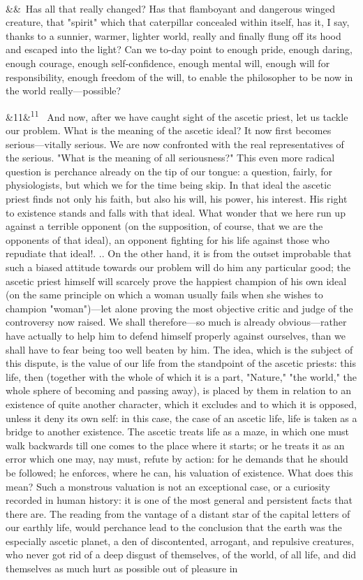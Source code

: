 \documentclass[12pt]{article}
\newcommand{\para}[1][]{\par\noindent\ifx&#1&\else\textsuperscript{\footnotesize #1}~\fi}
\begin{document}
\para Has all that really changed? Has that flamboyant and dangerous winged creature, that "spirit" which that caterpillar concealed within itself, has it, I say, thanks to a sunnier, warmer, lighter world, really and finally flung off its hood and escaped into the light? Can we to-day point to enough pride, enough daring, enough courage, enough self-confidence, enough mental will, enough will for responsibility, enough freedom of the will, to enable the philosopher to be now in the world really---possible?

\para[11] And now, after we have caught sight of the ascetic priest, let us tackle our problem. What is the meaning of the ascetic ideal? It now first becomes serious---vitally serious. We are now confronted with the real representatives of the serious. "What is the meaning of all seriousness?" This even more radical question is perchance already on the tip of our tongue: a question, fairly, for physiologists, but which we for the time being skip. In that ideal the ascetic priest finds not only his faith, but also his will, his power, his interest. His right to existence stands and falls with that ideal. What wonder that we here run up against a terrible opponent (on the supposition, of course, that we are the opponents of that ideal), an opponent fighting for his life against those who repudiate that ideal!. .. On the other hand, it is from the outset improbable that such a biased attitude towards our problem will do him any particular good; the ascetic priest himself will scarcely prove the happiest champion of his own ideal (on the same principle on which a woman usually fails when she wishes to champion "woman")---let alone proving the most objective critic and judge of the controversy now raised. We shall therefore---so much is already obvious---rather have actually to help him to defend himself properly against ourselves, than we shall have to fear being too well beaten by him. The idea, which is the subject of this dispute, is the value of our life from the standpoint of the ascetic priests: this life, then (together with the whole of which it is a part, "Nature," "the world," the whole sphere of becoming and passing away), is placed by them in relation to an existence of quite another character, which it excludes and to which it is opposed, unless it deny its own self: in this case, the case of an ascetic life, life is taken as a bridge to another existence. The ascetic treats life as a maze, in which one must walk backwards till one comes to the place where it starts; or he treats it as an error which one may, nay must, refute by action: for he demands that he should be followed; he enforces, where he can, his valuation of existence. What does this mean? Such a monstrous valuation is not an exceptional case, or a curiosity recorded in human history: it is one of the most general and persistent facts that there are. The reading from the vantage of a distant star of the capital letters of our earthly life, would perchance lead to the conclusion that the earth was the especially ascetic planet, a den of discontented, arrogant, and repulsive creatures, who never got rid of a deep disgust of themselves, of the world, of all life, and did themselves as much hurt as possible out of pleasure in 
\end{document}
